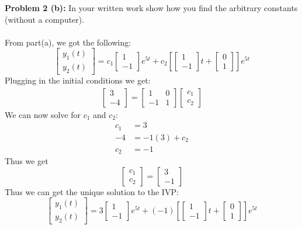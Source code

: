 \documentclass[12pt]{article}
\begin{document}
\noindent \textbf{Problem 2 (b): }In your written work show how you find the arbitrary constants (without a computer).
\\ \\
From part(a), we got the following:
$$
\begin{bmatrix} y_1(t) \\ y_2(t) \end{bmatrix} =
c_1 \begin{bmatrix}	1 \\ -1	\end{bmatrix} e^{5t} +
c_2  \left[ \begin{bmatrix}	1 \\ -1	\end{bmatrix}t + \begin{bmatrix} 0 \\ 1 \end{bmatrix} \right]e^{5t}
$$	
Plugging in the initial conditions we get:
\begin{align*}
\begin{bmatrix} 3 \\ -4 \end{bmatrix} =
\begin{bmatrix}	1  & 0 \\ -1 & 1	\end{bmatrix}
\begin{bmatrix}	c_1 \\ c_2	\end{bmatrix}
\end{align*}
We can now solve for $c_1$ and $c_2$:
	\begin{align*}
		c_1 &= 3 \\
		-4 &= -1(3) + c_2 \\
		c_2 &= -1 
	\end{align*}
Thus we get
$$
\begin{bmatrix}	c_1 \\ c_2	\end{bmatrix} = \begin{bmatrix}	3 \\ -1	\end{bmatrix}
$$
Thus we can get the unique solution to the IVP:
$$
\begin{bmatrix} y_1(t) \\ y_2(t) \end{bmatrix} =
3 \begin{bmatrix}	1 \\ -1	\end{bmatrix} e^{5t} +
(-1)  \left[ \begin{bmatrix}	1 \\ -1	\end{bmatrix}t + \begin{bmatrix} 0 \\ 1 \end{bmatrix} \right]e^{5t}
$$
\end{document}
